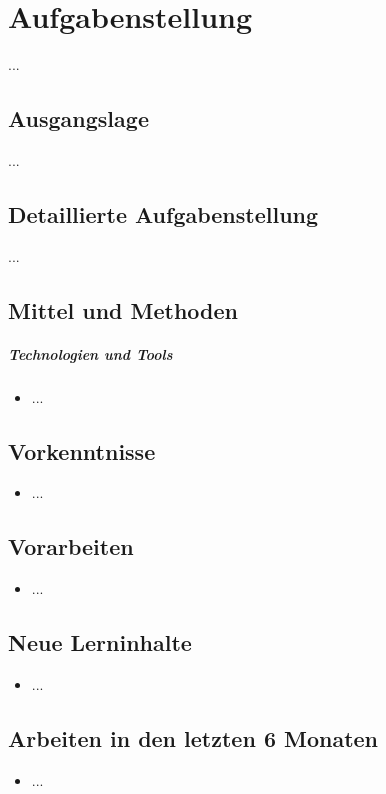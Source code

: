 \chapter{Aufgabenstellung}\label{ch:aufgabenstellung}
...


\section{Ausgangslage}\label{sec:ausgangslage}
...


\section{Detaillierte Aufgabenstellung}\label{sec:detaillierte-aufgabenstellung}
...


\section{Mittel und Methoden}\label{sec:mittel-und-methoden}

\paragraph{Technologien und Tools}
\begin{itemize}
    \item ...
\end{itemize}


\section{Vorkenntnisse}\label{sec:vorkenntnisse}
\begin{itemize}
    \item ...
\end{itemize}


\section{Vorarbeiten}\label{sec:vorarbeiten}
\begin{itemize}
    \item ...
\end{itemize}


\section{Neue Lerninhalte}\label{sec:neue-lerninhalte}
\begin{itemize}
    \item ...
\end{itemize}


\section{Arbeiten in den letzten 6 Monaten}\label{sec:arbeiten-in-den-letzten-6-monaten}
\begin{itemize}
    \item ...
\end{itemize}
